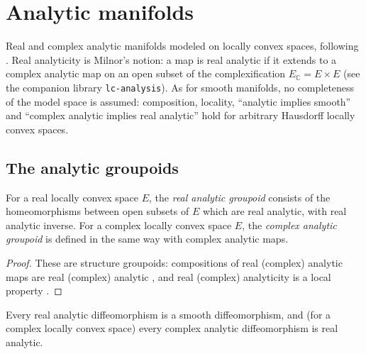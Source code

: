 \chapter{Analytic manifolds}
\label{chap:analytic}

Real and complex analytic manifolds modeled on locally convex spaces, following
\cite[Definitions~3.1.3--3.1.4 and~2.2.18]{GN26}. Real analyticity is Milnor's notion: a map is
real analytic if it extends to a complex analytic map on an open subset of the complexification
$E_{\mathbb{C}} = E \times E$ (see the companion library \texttt{lc-analysis}). As for smooth manifolds,
no completeness of the model space is assumed: composition, locality, ``analytic implies
smooth'' and ``complex analytic implies real analytic'' hold for arbitrary Hausdorff locally
convex spaces.

\section{The analytic groupoids}

\begin{definition}
  \label{def:analytic-groupoids}
  \leanok
  For a real locally convex space $E$, the \emph{real analytic groupoid} consists of the
  homeomorphisms between open subsets of $E$ which are real analytic, with real analytic
  inverse. For a complex locally convex space $E$, the \emph{complex analytic groupoid} is
  defined in the same way with complex analytic maps.
\end{definition}

\begin{proof}
  \leanok
  These are structure groupoids: compositions of real (complex) analytic maps are real
  (complex) analytic \cite[Proposition~2.2.4]{GN26}, and real (complex) analyticity is a local
  property \cite[Lemma~2.2.3]{GN26}.
\end{proof}

\begin{proposition}
  \label{prop:analytic-groupoids-le}
  \leanok
  Every real analytic diffeomorphism is a smooth diffeomorphism, and (for a complex locally
  convex space) every complex analytic diffeomorphism is real analytic.
\end{proposition}

